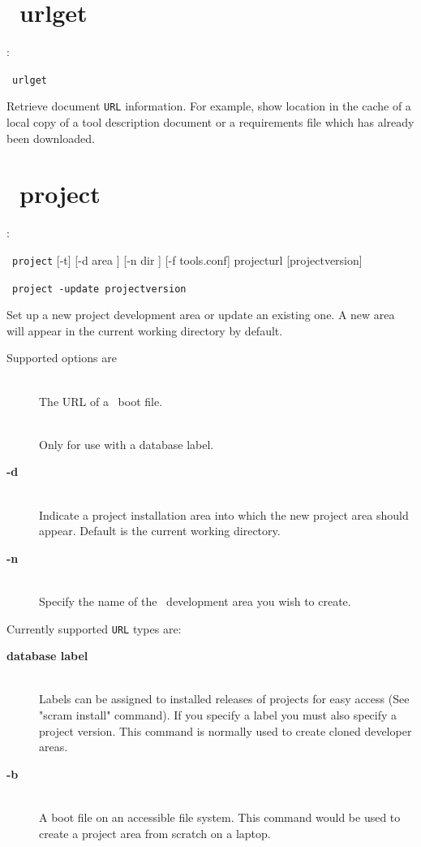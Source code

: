 \section{\scram\ urlget}

\cmdintro:

\hspace{5mm}\scram~\texttt{urlget}~

\ni Retrieve document \texttt{URL} information. For example, show location in the cache
of a local copy of a tool description document or a requirements file
which has already been downloaded.

\section{\scram\ project}

\cmdintro:

\hspace{5mm}\scram~\texttt{project} [-t] [-d area ] [-n dir ] [-f tools.conf] projecturl [projectversion]

\hspace{5mm}\scram~\texttt{project}~\texttt{-update}~\texttt{projectversion}

\ni Set up a new project development area or update an existing one. A new area will appear in the
current working directory by default.

\ni Supported options are
\begin{description}
\item[]\mbox{}\\
  The URL of a \scram\ boot file.
\item[]\mbox{}\\ 
  Only for use with a database label.
\item[\textbf{-d}~]\mbox{}\\
  Indicate a project installation area into which the new
  project area should appear. Default is the current working
  directory.
\item[\textbf{-n}~]\mbox{}\\
  Specify the name of the \scram\ development area you wish to
  create.
\end{description}

\ni Currently supported \texttt{URL} types are:
\begin{description}
\item[\textbf{database label}]\mbox{}\\	
  Labels can be assigned to installed releases of projects for easy
  access (See "scram install" command). If you specify a label you must also specify
  a project version. This command is normally used to create cloned developer areas.
\item[\textbf{-b}~]\mbox{}\\
  A boot file on an accessible file system. This command would
  be used to create a project area from scratch on a laptop.
\end{description}

